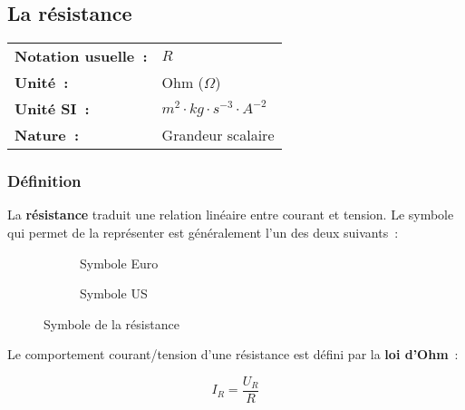 \subsection{ La résistance }

\vspace{0.5cm}
\begin{tabular}{ll}
\textbf{Notation usuelle~:} & $R$ \\
\textbf{Unité~:} & Ohm ($\Omega$) \\
\textbf{Unité SI~:} & $m^2 \cdot kg \cdot {s}^{-3} \cdot A^{-2}$ \\
\textbf{Nature~:} & Grandeur scalaire \\
\end{tabular} 

\subsubsection*{Définition}

La \textbf{résistance} traduit une relation linéaire entre courant et tension. Le symbole qui permet de la représenter est généralement l'un des deux suivants~:

\begin{figure}[!h]
\centering
\begin{subfigure}{.4\textwidth}
\centering
	
\caption{Symbole Euro}
\end{subfigure}%
\begin{subfigure}{.4\textwidth}
\centering
	 
\caption{Symbole US}
\end{subfigure}
\caption{Symbole de la résistance}
\end{figure}

Le comportement courant/tension d'une résistance est défini par la \textbf{loi d'Ohm}~:\\
\begin{center}
\begin{minipage}{.2\textwidth}
\begin{center}

\end{center}
\end{minipage}
\hspace{1cm}
\begin{minipage}{.3\textwidth} 
\begin{equation}
	I_R = \dfrac{U_R}{R}
\end{equation}
\end{minipage}
\end{center}

